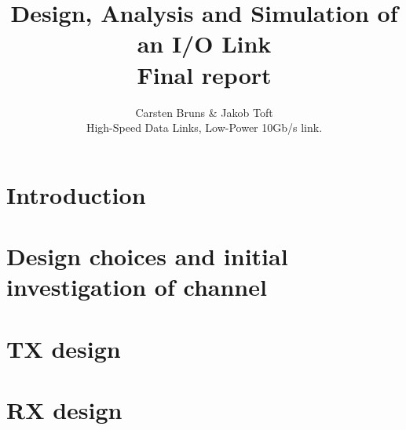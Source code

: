 \documentclass[12pt,journal,compsoc,onecolumn]{IEEEtran}
\begin{document}
%
\title{Design, Analysis and Simulation of an I/O Link\\Final report}

\author{Carsten Bruns
        \& Jakob Toft%



\begin{IEEEkeywords}
High-Speed Data Links, Low-Power 10Gb/s link.
\end{IEEEkeywords}}


\maketitle

\IEEEdisplaynotcompsoctitleabstractindextext
\IEEEpeerreviewmaketitle

\tableofcontents
\listoffigures
\listoftables

\cleardoublepage
\section{Introduction}


\cleardoublepage
\section{Design choices and initial investigation of channel}





\cleardoublepage
\section{TX design}







\cleardoublepage
\section{RX design}







\end{document}
